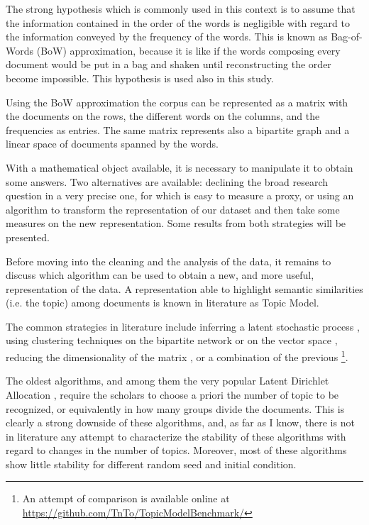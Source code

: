 \documentclass[a4paper, 11pt, headings=standardclasses, tablecaptionsbelow]{scrartcl}
\begin{document}
The strong hypothesis which is commonly used in this context is to assume that the information contained in the order of the words is negligible with regard to the information conveyed by the frequency of the words. This is known as Bag-of-Words (BoW) approximation, because it is like if the words composing every document would be put in a bag and shaken until reconstructing the order become impossible. This hypothesis is used also in this study.

Using the BoW approximation the corpus can be represented as a matrix with the documents on the rows, the different words on the columns, and the frequencies as entries. The same matrix represents also a bipartite graph and a linear space of documents spanned by the words.

With a mathematical object available, it is necessary to manipulate it to obtain some answers. Two alternatives are available: declining the broad research question in a very precise one, for which is easy to measure a proxy, or using an algorithm to transform the representation of our dataset and then take some measures on the new representation.
Some results from both strategies will be presented.

Before moving into the cleaning and the analysis of the data, it remains to discuss which algorithm can be used to obtain a new, and more useful, representation of the data. A representation able to highlight semantic similarities (i.e. the topic) among documents is known in literature as Topic Model.

The common strategies in literature include inferring a latent stochastic process \parencite{blei2003,teh2005,griffiths2004,hofmann1999}, using clustering techniques on the bipartite network \parencite{gerlach2018} or on the vector space \parencite{angelov2020,grootendorst2022}, reducing the dimensionality of the matrix \parencite{kim2008}, or a combination of the previous \parencite{lancichinetti2015}\footnote{An attempt of comparison is available online at \url{https://github.com/TnTo/TopicModelBenchmark/}}.

The oldest algorithms, and among them the very popular Latent Dirichlet Allocation \parencite[LDA][]{blei2003}, require the scholars to choose a priori the number of topic to be recognized, or equivalently in how many groups divide the documents. This is clearly a strong downside of these algorithms, and, as far as I know, there is not in literature any attempt to characterize the stability of these algorithms with regard to changes in the number of topics. Moreover, most of these algorithms show little stability for different random seed and initial condition.
\end{document}
